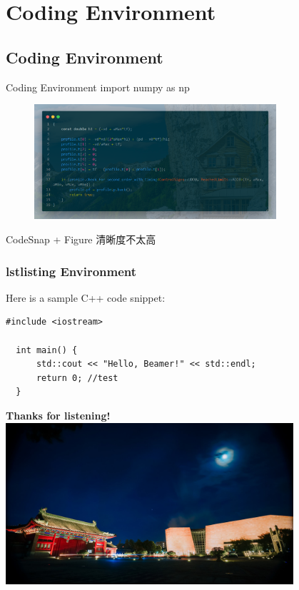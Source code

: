 \documentclass[xcolor=x11names,compress,aspectratio=169]{ctexbeamer}
\begin{document}
\section{Coding Environment}
\subsection{Coding Environment}
\begin{frame}{Coding Environment}
import numpy as np

\begin{figure}
\includegraphics[width=0.8\textwidth]{Figure/code.png}
\end{figure}

CodeSnap + Figure 清晰度不太高


\end{frame}


\begin{frame}[fragile] %
  \frametitle{lstlisting Environment}
  
  Here is a sample C++ code snippet:\\
  
  \begin{lstlisting}[caption={Sample C++ Code}]
  #include <iostream>
  
  int main() {
      std::cout << "Hello, Beamer!" << std::endl;
      return 0; //test
  }
  \end{lstlisting}
  
  \end{frame}

  
  \begin{frame}
    \begin{center}
      \vspace{1cm}
      \Huge \textbf{Thanks for listening!}
      \vspace{2cm}
      \includegraphics[width=0.8\textwidth]{Figure/siyuan.jpg} %
    \end{center}
  \end{frame}
\end{document}
